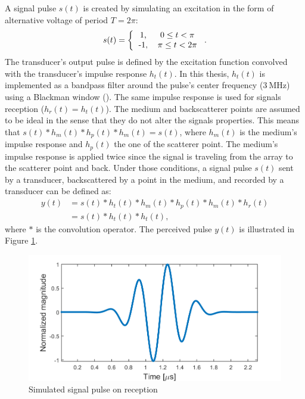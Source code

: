 A signal pulse $s(t)$ is created by simulating an excitation in the form of alternative voltage of period $T = 2\pi$:
\begin{equation}
    s(t) = \left \{ \begin{tabular}{cc}
        1, & $0 \leq t < \pi$ \\
        -1, & $\pi \leq t < 2\pi$
    \end{tabular}\right..
\end{equation}
\noindent
The transducer's output pulse is defined by the excitation function convolved with the transducer's impulse response $h_t(t)$.
In this thesis, $h_t(t)$ is implemented as a bandpass filter around the pulse's center frequency ($3~$MHz) using a Blackman window (\cite{blackman}). The same impulse response is used for signals reception ($h_r(t) = h_t(t)$). The medium and backscatterer points are assumed to be ideal in the sense that they do not alter the signals properties. This means that $s(t) * h_m(t) * h_p(t) * h_m(t) = s(t)$, where $h_m(t)$ is the medium's impulse response and $h_p(t)$ the one of the scatterer point. The medium's impulse response is applied twice since the signal is traveling from the array to the scatterer point and back.
Under those conditions, a signal pulse $s(t)$ sent by a transducer, backscattered by a point in the medium, and recorded by a transducer can be defined as:
\begin{align}
    y(t) &= s(t) * h_t(t) * h_m(t) * h_p(t) * h_m(t) * h_r(t) \nonumber \\
    &= s(t) * h_t(t) * h_t(t),
\end{align}
\noindent
where $*$ is the convolution operator. The perceived pulse $y(t)$ is illustrated in Figure \ref{fig:pulse}.

\begin{figure}
    \centering
    \includegraphics[width=\linewidth]{./images/others/pulse.png}
    \caption{Simulated signal pulse on reception}
    \label{fig:pulse}
\end{figure}

